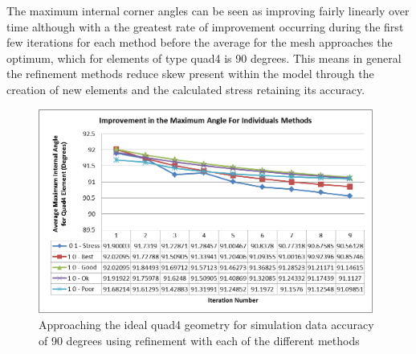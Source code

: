 \noindent
The maximum internal corner angles can be seen as improving fairly linearly over time although with a the greatest rate of improvement occurring during the first few iterations for each method before the average for the mesh approaches the optimum, which for elements of type quad4 is 90 degrees. This means in general the refinement methods reduce skew present within the model through the creation of new elements and the calculated stress retaining its accuracy. 



\begin{figure}[H]
  \centerline{\includegraphics[width=110mm, scale=1]{../Graphics/Graphs/SingleMethods/AngleImprovements.png}}
  \caption{Approaching the ideal quad4 geometry for simulation data accuracy of 90 degrees using refinement with each of the different methods}
  \label{fig:sub1}
\end{figure}  

\noindent

